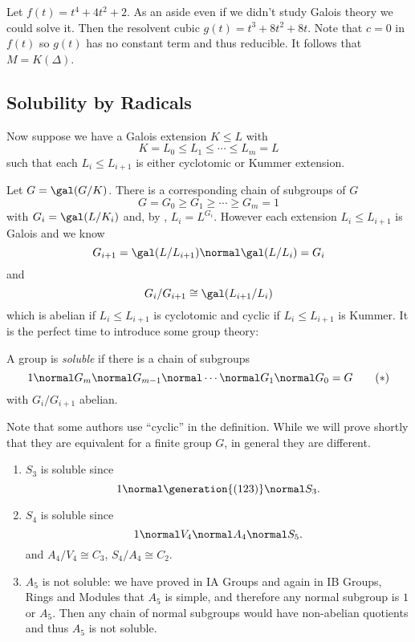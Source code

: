 \documentclass[a4paper]{article}
\begin{document}
\begin{eg}
  Let \(f(t) = t^4 + 4t^2 + 2\). As an aside even if we didn't study Galois theory we could solve it. Then the resolvent cubic \(g(t) = t^3 + 8t^2 + 8t\). Note that \(c = 0\) in \(f(t)\) so \(g(t)\) has no constant term and thus reducible. It follows that \(M = K(\Delta)\).
\end{eg}

\subsection{Solubility by Radicals}

Now suppose we have a Galois extension \(K \leq L\) with
\[
  K = L_0 \leq L_1 \leq \cdots \leq L_m = L
\]
such that each \(L_i \leq L_{i + 1}\) is either cyclotomic or Kummer extension.

Let \(G = \gal(G/K)\). There is a corresponding chain of subgroups of \(G\)
\[
  G = G_0 \geq G_1 \geq \cdots \geq G_m = 1
\]
with \(G_i = \gal(L/K_i)\) and, by , \(L_i = L^{G_i}\). However each extension \(L_i \leq L_{i + 1}\) is Galois and we know
\[
  G_{i + 1} = \gal(L/L_{i + 1}) \normal \gal(L/L_i) = G_i
\]
and
\[
  G_i/G_{i + 1} \cong \gal(L_{i + 1}/L_i)
\]
which is abelian if \(L_i \leq L_{i + 1}\) is cyclotomic and cyclic if \(L_i \leq L_{i + 1}\) is Kummer. It is the perfect time to introduce some group theory:

\begin{definition}
  A group is \emph{soluble} if there is a chain of subgroups
  \begin{equation*}
    \label{eqn:abelian soluble}
    1 \normal G_m \normal G_{m - 1} \normal \cdots \normal G_1 \normal G_0 = G
    \tag{\(\ast\)}
  \end{equation*}
  with \(G_i/G_{i + 1}\) abelian.
\end{definition}

\begin{remark}
  Note that some authors use ``cyclic'' in the definition. While we will prove shortly that they are equivalent for a finite group \(G\), in general they are different.
\end{remark}

\begin{eg}\leavevmode
  \begin{enumerate}
  \item \(S_3\) is soluble since
    \[
      1 \normal \generation{(123)} \normal S_3.
    \]
  \item \(S_4\) is soluble since
    \[
      1 \normal V_4 \normal A_4 \normal S_5.
    \]
    and \(A_4/V_4 \cong C_3\), \(S_4/A_4 \cong C_2\).
  \item \(A_5\) is not soluble: we have proved in IA Groups and again in IB Groups, Rings and Modules that \(A_5\) is simple, and therefore any normal subgroup is \(1\) or \(A_5\). Then any chain of normal subgroups would have non-abelian quotients and thus \(A_5\) is not soluble.
  \end{enumerate}
\end{eg}
\end{document}
